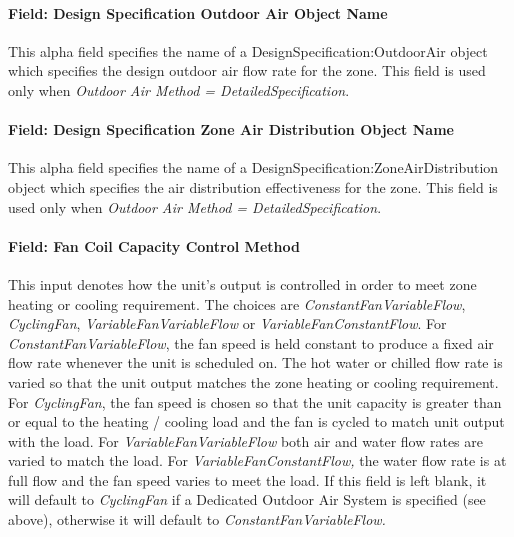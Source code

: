 \paragraph{Field: Design Specification Outdoor Air Object Name}\label{field-design-specification-outdoor-air-object-name-2-000}

This alpha field specifies the name of a DesignSpecification:OutdoorAir object which specifies the design outdoor air flow rate for the zone. This field is used only when \emph{Outdoor Air Method = DetailedSpecification}.

\paragraph{Field: Design Specification Zone Air Distribution Object Name}\label{field-design-specification-zone-air-distribution-object-name-1}

This alpha field specifies the name of a DesignSpecification:ZoneAirDistribution object which specifies the air distribution effectiveness for the zone. This field is used only when \emph{Outdoor Air Method = DetailedSpecification}.

\paragraph{Field: Fan Coil Capacity Control Method}\label{field-fan-coil-capacity-control-method}

This input denotes how the unit's output is controlled in order to meet zone heating or cooling requirement. The choices are \emph{ConstantFanVariableFlow}, \emph{CyclingFan}, \emph{VariableFanVariableFlow} or \emph{VariableFanConstantFlow}. For \emph{ConstantFanVariableFlow}, the fan speed is held constant to produce a fixed air flow rate whenever the unit is scheduled on. The hot water or chilled flow rate is varied so that the unit output matches the zone heating or cooling requirement. For \emph{CyclingFan}, the fan speed is chosen so that the unit capacity is greater than or equal to the heating / cooling load and the fan is cycled to match unit output with the load. For \emph{VariableFanVariableFlow} both air and water flow rates are varied to match the load. For \emph{VariableFanConstantFlow,} the water flow rate is at full flow and the fan speed varies to meet the load. If this field is left blank, it will default to \emph{CyclingFan} if a Dedicated Outdoor Air System is specified (see above), otherwise it will default to \emph{ConstantFanVariableFlow.}

